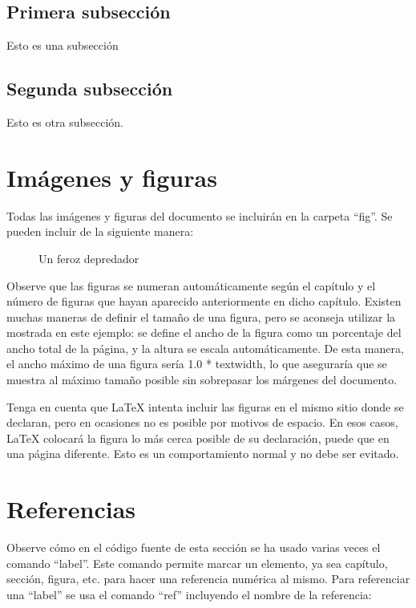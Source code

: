 \subsection{Primera subsección}\label{sec:subseccion}
Esto es una subsección

\subsection{Segunda subsección}
Esto es otra subsección.

\section{Imágenes y figuras}
Todas las imágenes y figuras del documento se incluirán en la carpeta ``fig''. Se pueden incluir de la siguiente manera:

\begin{figure}[htp]
    \centering

    \caption{Un feroz depredador}
    \label{fig:ejemplo}
\end{figure}

Observe que las figuras se numeran automáticamente según el capítulo y el número de figuras que hayan aparecido anteriormente en dicho capítulo. Existen muchas maneras de definir el tamaño de una figura, pero se aconseja utilizar la mostrada en este ejemplo: se define el ancho de la figura como un porcentaje del ancho total de la página, y la altura se escala automáticamente. De esta manera, el ancho máximo de una figura sería 1.0 * textwidth, lo que aseguraría que se muestra al máximo tamaño posible sin sobrepasar los márgenes del documento.

Tenga en cuenta que LaTeX intenta incluir las figuras en el mismo sitio donde se declaran, pero en ocasiones no es posible por motivos de espacio. En esos casos, LaTeX colocará la figura lo más cerca posible de su declaración, puede que en una página diferente. Esto es un comportamiento normal y no debe ser evitado.

\section{Referencias}
Observe cómo en el código fuente de esta sección se ha usado varias veces el comando ``label''. Este comando permite marcar un elemento, ya sea capítulo, sección, figura, etc. para hacer una referencia numérica al mismo. Para referenciar una ``label'' se usa el comando ``ref'' incluyendo el nombre de la referencia:


